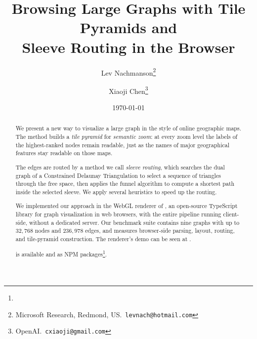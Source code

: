 \title{Browsing Large Graphs with Tile Pyramids and\\
       Sleeve Routing in the Browser}
\author{%
  Lev Nachmanson\thanks{Microsoft Research, Redmond, US.\
    \texttt{levnach@hotmail.com}}%
  \and
  Xiaoji Chen\thanks{OpenAI.\ \texttt{cxiaoji@gmail.com}}%
}
\date{\today}



\maketitle

\begin{abstract}
We present a new way to visualize a large graph in the style of
online geographic maps. The method builds a \emph{tile pyramid} for
\emph{semantic zoom}: at every zoom level the labels of the
highest-ranked nodes remain readable, just as the names of major
geographical features stay readable on those maps.

The edges are routed by a method we call \emph{sleeve routing}, which
searches the dual graph of a Constrained Delaunay Triangulation to
select a sequence of triangles through the free space, then applies the
funnel algorithm to compute a shortest path inside the selected
sleeve. We apply several heuristics to speed up the routing.

We implemented our approach in the WebGL renderer of \msagljs{}, an
open-source TypeScript library for graph visualization in web
browsers, with the entire pipeline running client-side, without a
dedicated server. Our benchmark suite contains nine graphs with up to
$32{,}768$ nodes and $236{,}978$ edges, and measures browser-side
parsing, layout, routing, and tile-pyramid construction. The renderer's
demo can be seen at
.

\msagljs{} is available
 and as
NPM packages\footnote{}.
\end{abstract}

